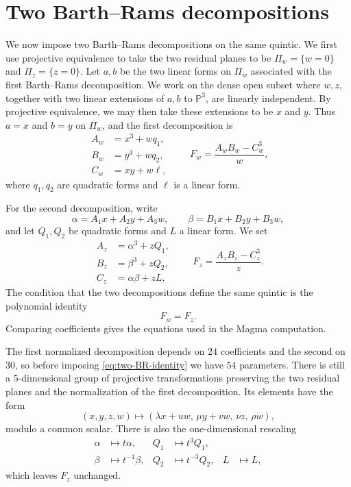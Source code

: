 \documentclass[10pt,a4paper]{article}
\begin{document}
\section{Two Barth--Rams decompositions}
\label{sec:two-BR}

We now impose two Barth--Rams decompositions on the same quintic.  We first
use projective equivalence to take the two residual planes to be
$\Pi_w=\{w=0\}$ and $\Pi_z=\{z=0\}$.  Let $a,b$ be the two linear forms
on $\Pi_w$ associated with the first Barth--Rams decomposition.  We work on
the dense open subset where $w,z$, together with two linear extensions of
$a,b$ to $\mathbb P^3$, are linearly independent.  By projective equivalence,
we may then take these extensions to be $x$ and $y$.  Thus $a=x$ and $b=y$
on $\Pi_w$, and the first decomposition is
\[
\begin{aligned}
        A_w&=x^3+wq_1,\\
        B_w&=y^3+wq_2,\\
        C_w&=xy+w\ell,
\end{aligned}
\qquad
        F_w=\frac{A_wB_w-C_w^3}{w},
\]
where $q_1,q_2$ are quadratic forms and $\ell$ is a linear form.

For the second decomposition, write
\[
        \alpha=A_1x+A_2y+A_3w,
        \qquad
        \beta=B_1x+B_2y+B_3w,
\]
and let $Q_1,Q_2$ be quadratic forms and $L$ a linear form.  We set
\[
\begin{aligned}
        A_z&=\alpha^3+zQ_1,\\
        B_z&=\beta^3+zQ_2,\\
        C_z&=\alpha\beta+zL,
\end{aligned}
\qquad
        F_z=\frac{A_zB_z-C_z^3}{z}.
\]
The condition that the two decompositions define the same quintic is the
polynomial identity
\begin{equation}
 \label{eq:two-BR-identity}
        F_w=F_z.
\end{equation}
Comparing coefficients gives the equations used in the Magma computation.


The first normalized decomposition depends on $24$ coefficients and the
second on $30$, so before imposing \eqref{eq:two-BR-identity} we have $54$
parameters.  There is still a $5$-dimensional group of projective
transformations preserving the two residual planes and the normalization of
the first decomposition.  Its elements have the form
\begin{equation}
 \label{eq:residual-projectivities}
 (x,y,z,w)\longmapsto
 (\lambda x+uw,\,\mu y+vw,\,\nu z,\,\rho w),
\end{equation}
modulo a common scalar.  There is also the one-dimensional rescaling
\begin{equation}
 \label{eq:second-BR-rescaling}
 \begin{aligned}
        \alpha&\longmapsto t\alpha,
        &Q_1&\longmapsto t^3Q_1,\\
        \beta&\longmapsto t^{-1}\beta,
        &Q_2&\longmapsto t^{-3}Q_2,
        &L&\longmapsto L,
 \end{aligned}
\end{equation}
which leaves $F_z$ unchanged.
\end{document}
